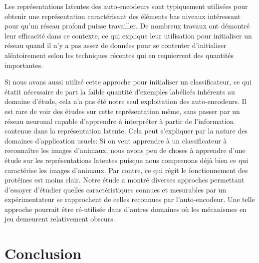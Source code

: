 \documentclass[a4paper, 11pt, onecolumn]{article}
\begin{document}
Les représentations latentes des auto-encodeurs sont typiquement utilisées pour
obtenir une représentation caractérisant des éléments bas niveaux intéressant
pour qu'un réseau profond puisse travailler. De nombreux travaux ont démontré
leur efficacité dans ce contexte, ce qui explique leur utilisation pour
initialiser un réseau quand il n'y a pas assez de données pour se contenter
d'initialiser aléatoirement selon les techniques récentes qui en requierrent des
quantités importantes.

Si nous avons aussi utilisé cette approche pour initialiser un classificateur,
ce qui étatit nécessaire de part la faible quantité d'exemples labélisés
inhérents au domaine d'étude, cela n'a pas été notre seul exploitation des
auto-encodeurs. Il est rare de voir des études sur cette représentation même,
sans passer par un réseau neuronal capable d'apprendre à interpréter à partir de
l'information contenue dans la représentation latente. Cela peut s'expliquer par
la nature des domaines d'application usuels: Si on veut apprendre à un
classificateur à reconnaître les images d'animaux, nous avons peu de choses à
apprendre d'une étude sur les représentations latentes puisque nous comprenons
déjà bien ce qui caractérise les images d'animaux. Par contre, ce qui régit le
fonctionnement des protéines est moins clair. Notre étude a montré diverses
approches permettant d'essayer d'étudier quelles caractéristiques connues et
mesurables par un expérimentateur se rapprochent de celles reconnues par
l'auto-encodeur. Une telle approche pourrait être ré-utilisée dans d'autres
domaines où les mécanismes en jeu demeurent relativement obscurs.

\section*{Conclusion}

\printbibliography
\end{document}
